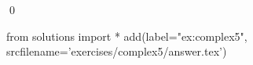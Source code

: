 
\begin{ex} 
  \label{ex:complex5}
  
  \qed
\end{ex} 
\begin{python0}
from solutions import *
add(label="ex:complex5",
    srcfilename='exercises/complex5/answer.tex') 
\end{python0}
